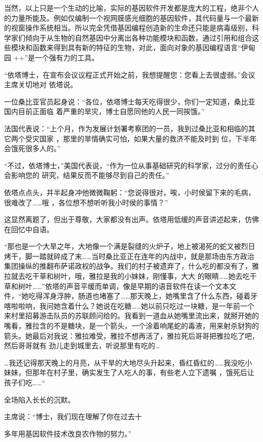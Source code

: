 \documentclass{article}
\begin{document}
当然，以上只是一个生动的比喻，实际的基因软件开发都是庞大的工程，绝非个人的力量所能及。例如仅编制一个视网膜感光细胞的基因软件，其代码量与一个最新的视窗操作系统相当。所以完全凭借基因编程创造新的生命还只能是病毒级别，科学家们倾向于从生物的自然基因中分离出各种功能模块和函数，通过引用和组合这些模块和函数来得到具有新的特征的生物，对此，面向对象的基因编程语言“伊甸园
++”是一个强有力的工具。 

“依塔博士，在宣布会议议程正式开始之前，我想提醒您：您看上去很虚弱。”会议主席关切地对
依塔说。 

一位桑比亚官员起身说：“各位，依塔博士每天吃得很少，你们一定知道，桑比亚国内目前正面临
着严重的旱灾，博士自愿同他的人民一同挨饿。” 

法国代表说：“上个月，作为发展计划署考察团的一员，我到过桑比亚和相临的其它两个受灾国家
\newpage
，那里的旱情确实可怕，如果大量的救济不能及时到
位，下半年会饿死很多人的。” 

“不过，依塔博士，”美国代表说，“作为一位从事基础研究的科学家，过分的责任心会影响您的
研究，结果反而不能够尽到自己的责任。” 

依塔点点头，并半起身冲他微微鞠躬：“您说得很对，唉，小时侯留下来的毛病，很难改了……哦
，各位想不想听听我小时侯的事情？” 

这显然离题了，但出于尊敬，大家都没有出声。依塔用低缓的声音讲述起来，仿佛在回忆中自语。
 

“那也是一个大旱之年，大地像一个满是裂缝的火炉子，地上被渴死的蛇又被烈日烤干，脚一踏就碎成了末……当时桑比亚正在连年的内战中，就是那场由东方政治集团操纵的推翻布萨诺政权的战争。我们的村子被遗弃了，什么吃的都没有了，雅拉就去吃干草和树叶，哦，雅拉是我的小妹妹，刚懂事，大大
\newpage
的眼睛……她去吃干草和树叶……”依塔的声音平缓而单调，像是早期的语音软件在读一个文本文件，“她吃得浑身浮肿，肠道也堵塞了……那天晚上，她嘴里含了什么东西，碰着牙喀啦啦响，我问她含着什么？她说在吃糖……她以前只吃过一块糖，是一年前一个来村里招募游击队员的苏联顾问给的。我看到一道血从她嘴里流出来，就掰开她的嘴看，雅拉含的不是糖块，是一个箭头，一个涂着响尾蛇的毒液，用来射杀豺狗的箭头。她最后对我说：雅拉难受，雅拉不想再活了，雅拉死后哥哥把雅拉吃了吧，然后哥哥就有
劲儿走到城里去，听说那里有吃的… 

…我还记得那天晚上的月亮，从干旱的大地尽头升起来，昏红昏红的……我没吃小妹妹，但那年在村子里，确实发生了人吃人的事，有些老人立下遗嘱
，饿死后让孩子们吃……“ 


全场陷入长长的沉默。 

主席说：“博士，我们现在理解了你在过去十

\newpage
多年用基因软件技术改良农作物的努力。” 
\end{document}

